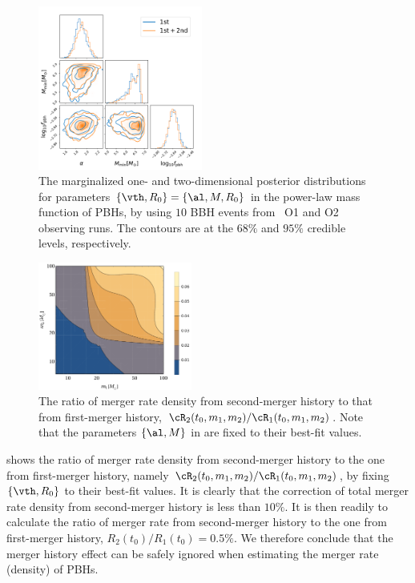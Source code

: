 \documentclass[
reprint,           %
superscriptaddress,%
amsmath,           %
amssymb,           %
aps,               %
prd,               %
notitlepage,       %
longbibliography,  %
floatfix,          %
showkeys,          %
]{revtex4-1}
\begin{document}
\begin{figure}[htbp!]
	\centering
	\includegraphics[width = 0.48\textwidth]{post-power.pdf}
	\caption{\label{posterior-power}
		The marginalized one- and two-dimensional posterior distributions for 
    parameters $\{\vth, R_0\} = \{\al, M, R_0\}$ in the power-law mass function 
    of PBHs, by using $10$ BBH events from \lvc\ O1 and O2 observing runs.
    The contours are at the $68\%$ and $95\%$ credible levels, respectively. 
	}
\end{figure}

\begin{figure}[htbp!]
	\centering
	\includegraphics[width = 0.45\textwidth]{ratio-power.pdf}
	\caption{\label{ratio-power}
		The ratio of merger rate density from second-merger history
        to that from first-merger history,
        $\cR_2(t_0, m_1, m_2)/\cR_1(t_0, m_1, m_2)$. Note that the parameters $\{\al, M\}$ in  are fixed to their best-fit values.
	}
\end{figure}

 shows the ratio of merger rate density from second-merger history
to the one from first-merger history, namely 
$\cR_2(t_0, m_1, m_2)/\cR_1(t_0, m_1, m_2)$, by fixing $\{\vth, R_0\}$ to their best-fit values.
It is clearly that the correction of total merger rate density from 
second-merger history is less than $10\%$.
It is then readily to calculate the ratio of merger rate from 
second-merger history to the one from first-merger history, 
$R_2(t_0)/R_1(t_0) = 0.5\%$.
We therefore conclude that the merger history effect can be safely ignored
when estimating the merger rate (density) of PBHs.
\end{document}
